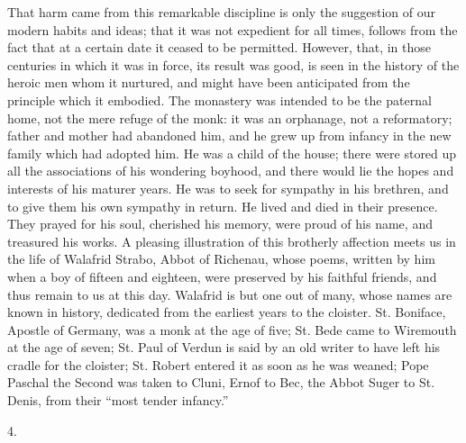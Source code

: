 That harm came from this remarkable discipline is only the
suggestion of our modern habits and ideas; that it was not expedient
for all times, follows from the fact that at a certain date it
ceased to be permitted. However, that, in those centuries in which it
was in force, its result was good, is seen in the history of the
heroic men whom it nurtured, and might have been anticipated from the
principle which it embodied. The monastery was intended to be the
paternal home, not the mere refuge of the monk: it was an orphanage,
not a reformatory; father and mother had abandoned him, and he grew up
from infancy in the new family which had adopted him. He was a child
of the house; there were stored up all the associations of his
wondering boyhood, and there would lie the hopes and interests of his
maturer years. He was to seek for sympathy in his brethren, and to
give them his own sympathy in return. He lived and died in their
presence. They prayed for his soul, cherished his memory, were proud
of his name, and treasured his works. A pleasing illustration of this
brotherly affection meets us in the life of Walafrid Strabo, Abbot of
Richenau, whose poems, written by him when a boy of fifteen and
eighteen, were preserved by his faithful friends, and thus remain to
us at this day. Walafrid is but one out of many, whose names are known
in history, dedicated from the earliest years to the cloister. St.
Boniface, Apostle of Germany, was a monk at the age of five; St. Bede
came to Wiremouth at the age of seven; St. Paul of Verdun is said by
an old writer to have left his cradle for the cloister; St. Robert
entered it as soon as he was weaned; Pope Paschal the Second was taken
to Cluni, Ernof to Bec, the Abbot Suger to St. Denis, from their
``most tender infancy.''

4.

